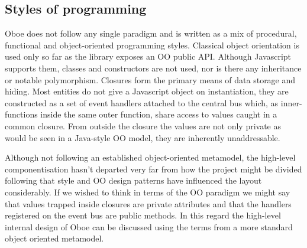 \documentclass[12pt, ]{article}
\begin{document}
\subsection{Styles of programming}\label{styles-of-programming}

Oboe does not follow any single paradigm and is written as a mix of
procedural, functional and object-oriented programming styles. Classical
object orientation is used only so far as the library exposes an OO
public API. Although Javascript supports them, classes and constructors
are not used, nor is there any inheritance or notable polymorphism.
Closures form the primary means of data storage and hiding. Most
entities do not give a Javascript object on instantiation, they are
constructed as a set of event handlers attached to the central bus
which, as inner-functions inside the same outer function, share access
to values caught in a common closure. From outside the closure the
values are not only private as would be seen in a Java-style OO model,
they are inherently unaddressable.

Although not following an established object-oriented metamodel, the
high-level componentisation hasn't departed very far from how the
project might be divided following that style and OO design patterns
have influenced the layout considerably. If we wished to think in terms
of the OO paradigm we might say that values trapped inside closures are
private attributes and that the handlers registered on the event bus are
public methods. In this regard the high-level internal design of Oboe
can be discussed using the terms from a more standard object oriented
metamodel.
\end{document}
